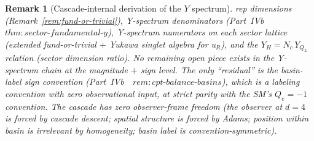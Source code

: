 \documentclass[12pt,a4paper]{article}
\newtheorem{remark}[theorem]{Remark}
\begin{document}
\begin{remark}[Cascade-internal derivation of the $Y$ spectrum]
rep dimensions (Remark~\ref{rem:fund-or-trivial}), Y-spectrum
denominators (Part~IVb~\cite{part4b}~$\mathit{thm{:}sector\text{-}fundamental\text{-}y}$),
Y-spectrum numerators on each sector lattice (extended fund-or-trivial
$+$ Yukawa singlet algebra for u$_R$), and the
$Y_H=N_c\,Y_{Q_L}$ relation (sector dimension ratio). No remaining
open piece exists in the Y-spectrum chain at the magnitude $+$ sign
level. The only ``residual'' is the basin-label sign convention
(Part~IVb~\cite{part4b}~$\mathit{rem{:}cpt\text{-}balance\text{-}basins}$),
which is a labeling convention with zero observational input, at
strict parity with the SM's $Q_e=-1$ convention.  The cascade has
\emph{zero observer-frame freedom} (the observer at $d=4$ is forced
by cascade descent; spatial structure is forced by Adams; position
within basin is irrelevant by homogeneity; basin label is
convention-symmetric).
\end{remark}
\end{document}
